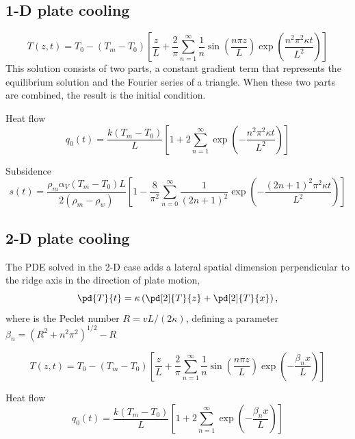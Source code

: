 \documentclass[final,12pt,a4paper]{article}
\begin{document}
\subsection{1-D plate cooling}

\begin{equation}
    T(z,t) = T_{0} - (T_{m} - T_{0})
    \left[\frac{z}{L} + \frac{2}{\pi}\sum_{n = 1}^{\infty}
    \frac{1}{n} \sin\left(\frac{n \pi z}{L}\right) \exp\left(\frac{n^2
    \pi^2 \kappa t}{L^2}\right) \right]
\end{equation}
This solution consists of two parts, a constant gradient term that
represents the equilibrium solution and the Fourier series of a
triangle.  When these two parts are combined, the result is the initial
condition.

Heat flow
\begin{equation}
    q_{0}(t) = \frac{k (T_{m} - T_{0})}{L}\left[ 1 + 2 \sum_{n = 1}^{\infty}
        \exp\left( -\frac{n^2 \pi^2 \kappa t}{L^2}\right) \right]
\end{equation}

Subsidence
\begin{equation}
    s(t) = \frac{\rho_{m} \alpha_{V} (T_{m} - T_{0}) L}{2 (\rho_{m} - \rho_{w})}
        \left[ 1 - \frac{8}{\pi^2} \sum_{n = 0}^{\infty} \frac{1}{(2n + 1)^2}
        \exp\left( -\frac{(2n + 1)^2 \pi^2 \kappa t}{L^2} \right) \right]
\end{equation}


\subsection{2-D plate cooling}
The PDE solved in the 2-D case adds a lateral spatial dimension
perpendicular to the ridge axis in the direction of plate motion,
\begin{equation}
    \pd{T}{t} = \kappa \left( \pd[2]{T}{z} + \pd[2]{T}{x} \right),
\end{equation}
where is the Peclet number $R = v L /(2 \kappa)$, defining a parameter
$\beta_{n} = (R^{2} + n^2 \pi^2)^{1/2} - R$

\begin{equation}
    T(z,t) = T_{0} - (T_{m} - T_{0})
    \left[ \frac{z}{L} + \frac{2}{\pi}\sum_{n = 1}^{\infty}
    \frac{1}{n} \sin \left(\frac{n \pi z}{L}\right)
    \exp\left(-\frac{\beta_{n} x}{L}\right)\right]
\end{equation}

Heat flow
\begin{equation}
    q_{0}(t) = \frac{k (T_{m} - T_{0})}{L}
        \left[ 1 + 2 \sum_{n = 1}^{\infty}
        \exp\left( - \frac{\beta_{n} x}{L} \right)\right]
\end{equation}
\end{document}
